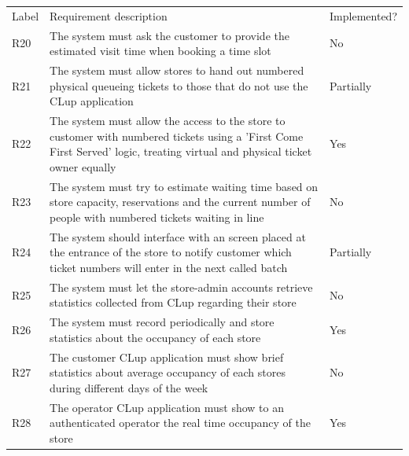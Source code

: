 \vfill

\begin{tabular}{C{1cm}L{11cm}C{3.1cm}}
    Label & Requirement description                                                                                                                                                         & Implemented? \\
    R20   & The system  must ask the customer to provide the estimated visit time when booking a time slot                                                                                  & No           \\
    R21   & The system must allow stores to hand out numbered physical queueing tickets to those that do not use the CLup application                                                       & Partially    \\
    R22   & The system must allow the access to the store to customer with numbered tickets using a 'First Come First Served' logic, treating virtual and physical ticket owner equally     & Yes          \\
    R23   & The system must try to estimate waiting time based on store capacity, reservations and the current number of people with numbered tickets waiting in line                       & No           \\
    R24   & The system should interface with an screen placed at the entrance of the store to notify customer which ticket numbers will enter in the next called batch                      & Partially    \\
    R25   & The system must let the store-admin accounts retrieve statistics collected from CLup regarding their store                                                                      & No           \\
    R26   & The system must record periodically and store statistics about the occupancy of each store                                                                                      & Yes          \\
    R27   & The customer CLup application must show brief statistics about average occupancy of each stores during different days of the week                                               & No           \\
    R28   & The operator CLup application must show to an authenticated operator the real time occupancy of the store                                                                       & Yes          \\

\end{tabular}
